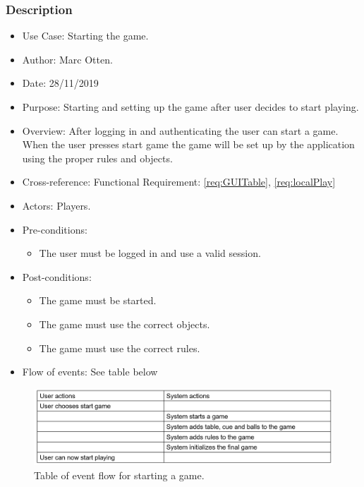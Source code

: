 \documentclass[10pt]{article}
\begin{document}
		\subsubsection{Description}
		\begin{itemize}
			\item{Use Case:} Starting the game.
			\item{Author:} Marc Otten.
			\item{Date:} 28/11/2019
			\item{Purpose:} Starting and setting up the game after user decides to start playing.
			\item{Overview:} After logging in and authenticating the user can start a game.
			When the user presses start game the game will be set up by the application using the proper
			rules and objects.
			\item{Cross-reference:} Functional Requirement: \ref{req:GUITable}, \ref{req:localPlay}
			\item{Actors:} Players.
			\item{Pre-conditions:} 
				\begin{itemize}
					\item The user must be logged in and use a valid session.
				\end{itemize}
			\item{Post-conditions:}
				\begin{itemize}
					\item The game must be started.
					\item The game must use the correct objects.
					\item The game must use the correct rules.
				\end{itemize}
				\item{Flow of events:} See table below
			\end{itemize}
		\begin{figure}[H]
			\includegraphics[width=\linewidth]{latex_images/StartgameTable.png}
			\caption{Table of event flow for starting a game.}
		\end{figure}
\end{document}

